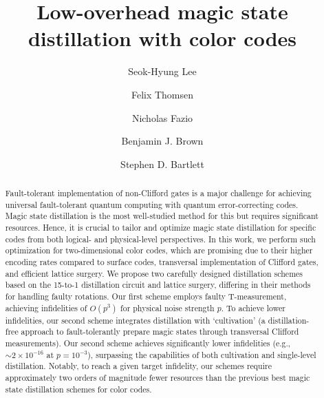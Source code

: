 \documentclass[
 prx,
 reprint,
 superscriptaddress,
 longbibliography,
 dvipsnames
]{revtex4-2}
\begin{document}
\title{Low-overhead magic state distillation with color codes}

\author{Seok-Hyung Lee}

\author{Felix Thomsen}

\author{Nicholas Fazio}

\author{Benjamin J. Brown}

\author{Stephen D. Bartlett}

\begin{abstract}
Fault-tolerant implementation of non-Clifford gates is a major challenge for achieving universal fault-tolerant quantum computing with quantum error-correcting codes.
Magic state distillation is the most well-studied method for this but requires significant resources.
Hence, it is crucial to tailor and optimize magic state distillation for specific codes from both logical- and physical-level perspectives.
In this work, we perform such optimization for two-dimensional color codes, which are promising due to their higher encoding rates compared to surface codes, transversal implementation of Clifford gates, and efficient lattice surgery.
We propose two carefully designed distillation schemes based on the 15-to-1 distillation circuit and lattice surgery, differing in their methods for handling faulty rotations.
Our first scheme employs faulty T-measurement, achieving infidelities of $O(p^3)$ for physical noise strength $p$.
To achieve lower infidelities, our second scheme integrates distillation with `cultivation' (a distillation-free approach to fault-tolerantly prepare magic states through transversal Clifford measurements).
Our second scheme achieves significantly lower infidelities (e.g., $\sim 2 \times 10^{-16}$ at $p = 10^{-3}$), surpassing the capabilities of both cultivation and single-level distillation.
Notably, to reach a given target infidelity, our schemes require approximately two orders of magnitude fewer resources than the previous best magic state distillation schemes for color codes.
\end{abstract}
\end{document}
